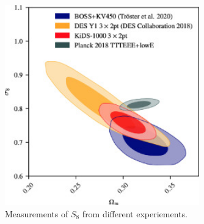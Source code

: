 \begin{figure}[ht]
	\centering
	\includegraphics[width=0.75\textwidth]{plots/s8_tension.jpg}
	\caption{Measurements of $S_8$ from different experiements.}
	\label{fig:s8_tension}
\end{figure}








